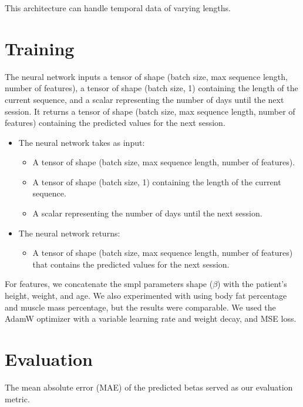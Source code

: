 This architecture can handle temporal data of varying lengths.

\section{Training}

The neural network inputs a tensor of shape (batch size, max sequence length,
number of features), a tensor of shape (batch size, 1) containing the length of
the current sequence, and a scalar representing the number of days until the
next session. It returns a tensor of shape (batch size, max sequence length,
number of features) containing the predicted values for the next session.

\begin{itemize}
    \item The neural network takes as input:
          \begin{itemize}
              \item A tensor of shape (batch size, max sequence length, number of features).
              \item A tensor of shape (batch size, 1) containing the length of the current
                    sequence.
              \item A scalar representing the number of days until the next session.
          \end{itemize}
    \item The neural network returns:
          \begin{itemize}
              \item A tensor of shape (batch size, max sequence length, number of features) that
                    contains the predicted values for the next session.
          \end{itemize}
\end{itemize}

For features, we concatenate the \gls{smpl} parameters shape ($\beta$) with the
patient's height, weight, and age. We also experimented with using body fat
percentage and muscle mass percentage, but the results were comparable. We used
the AdamW optimizer with a variable learning rate and weight decay, and MSE
loss.

\section{Evaluation}

The mean absolute error (MAE) of the predicted betas served as our evaluation
metric.

